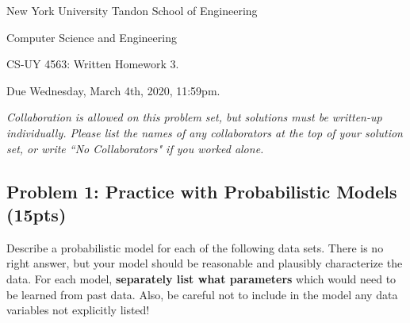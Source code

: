 \documentclass[10pt]{article}
\begin{document}
	
\begin{center}
	\normalsize
	New York University Tandon School of Engineering
	
	Computer Science and Engineering
	\medskip
	
	\large
	CS-UY 4563: Written Homework 3. 
	
	Due Wednesday, March 4th, 2020, 11:59pm.
	\medskip
	
	\normalsize 
	\noindent \emph{Collaboration is allowed on this problem set, but solutions must be written-up individually. Please list the names of any collaborators at the top of your solution set, or write ``No Collaborators" if you worked alone.}
	\medskip
\end{center} 

\subsection{Problem 1: Practice with Probabilistic Models (15pts)}
Describe a probabilistic model for each of the following data sets. There is no right answer, but your model should be reasonable and plausibly characterize the data. For each model, \textbf{separately list what parameters} which would need to be learned from past data. Also, be careful not to include in the model any data variables not explicitly listed!
\end{document}
